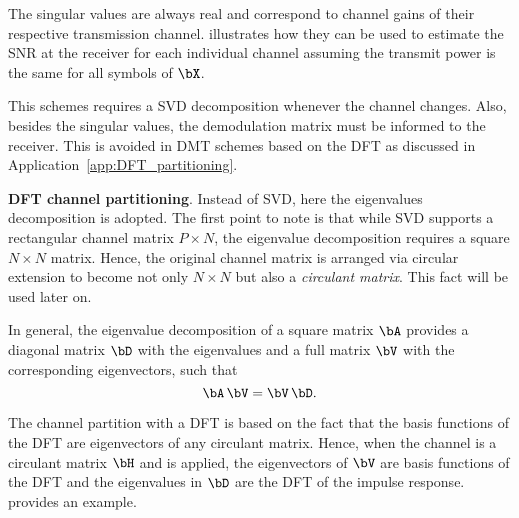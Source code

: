 
The singular values are always real and correspond to channel gains of their respective transmission channel.
 illustrates how they can be used to estimate the SNR at the receiver for each individual channel assuming the transmit power is the same for all symbols of $\bX$.


This schemes requires a SVD decomposition whenever the channel changes. Also, besides the singular values, the demodulation matrix must be informed to the receiver. This is avoided in DMT schemes based on the DFT as discussed in Application~\ref{app:DFT_partitioning}.
\eApplication

\bApplication \textbf{DFT channel partitioning}.
\label{app:DFT_partitioning}
Instead of SVD, here the eigenvalues decomposition is adopted. The first point to note is that while SVD supports a rectangular channel matrix $P \times N$, the eigenvalue decomposition requires a square $N \times N$ matrix. Hence, the original channel matrix is arranged via circular extension to become not only $N \times N$ but also a \emph{circulant matrix}. This fact will be used later on.

In general, the eigenvalue decomposition of a square matrix $\bA$ provides a diagonal matrix $\bD$ with the eigenvalues and a full matrix $\bV$ with the corresponding eigenvectors, such that
\begin{equation}
\bA \, \bV = \bV \, \bD.
\label{eq:eigenvalueDecomposition}
\end{equation}

The channel partition with a DFT is based on the fact that the basis functions of the DFT are eigenvectors of any circulant matrix.
Hence, when the channel is a circulant matrix $\bH$ and  is applied, 
the eigenvectors of $\bV$ are basis functions of the DFT and the eigenvalues in $\bD$ are the DFT of the impulse response.  provides an example.


